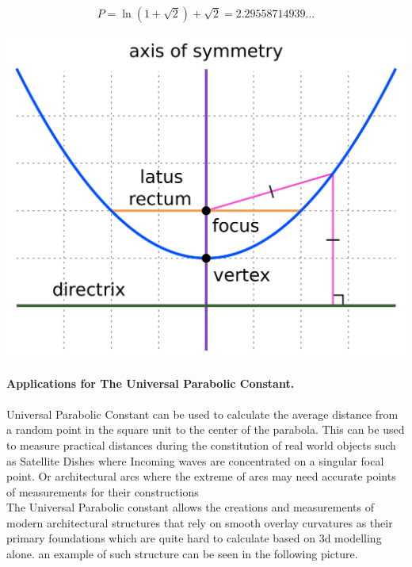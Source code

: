 \documentclass[30pt,a0,portrait]{a0poster}
\begin{document}
\begin{multicols}{2}
\hfill
 \begin{equation}
    {P=\ln(1+{\sqrt {2}})+{\sqrt {2}}=2.29558714939\dots }
\end{equation}
\begin{center}
\includegraphics[scale=0.5]{figures/parabola.png}
\end{center}

\noindent \textbf {Applications for The Universal Parabolic Constant.}
\hfill\\\\
\noindent Universal Parabolic Constant can be used to calculate the average distance from a random point in the square unit to the center of the parabola. This can be used to measure practical distances during the constitution of real world objects such as Satellite Dishes where Incoming waves are concentrated on a singular focal point. Or architectural arcs where the extreme of arcs may need accurate points of measurements for their constructions \\

\noindent  The Universal Parabolic constant allows the creations and measurements of modern architectural structures that rely on smooth overlay curvatures as their primary foundations which are quite hard to calculate based on 3d modelling alone. an example of such structure can be seen in the following picture.


\end{multicols}
\end{document}
